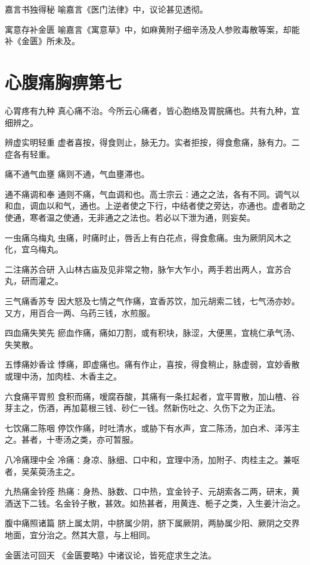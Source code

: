 \documentclass[a4paper,12pt,UTF8,twoside]{ctexbook}
\begin{document}
  嘉言书独得秘
  喻嘉言《医门法律》中，议论甚见透彻。
    
  寓意存补金匮
  喻嘉言《寓意草》中，如麻黄附子细辛汤及人参败毒散等案，却能补《金匮》所未及。
    
  \chapter{心腹痛胸痹第七}
  心胃疼有九种
  真心痛不治。今所云心痛者，皆心胞络及胃脘痛也。共有九种，宜细辨之。
    
  辨虚实明轻重
  虚者喜按，得食则止，脉无力。实者拒按，得食愈痛，脉有力。二症各有轻重。
    
  痛不通气血壅
  痛则不通，气血壅滞也。
    
  通不痛调和奉
  通则不痛，气血调和也。高士宗云∶通之之法，各有不同。调气以和血，调血以和气，通也。上逆者使之下行，中结者使之旁达，亦通也。虚者助之使通，寒者温之使通，无非通之之法也。若必以下泄为通，则妄矣。
    
  一虫痛乌梅丸
  虫痛，时痛时止，唇舌上有白花点，得食愈痛。虫为厥阴风木之化，宜乌梅丸。
    
  二注痛苏合研
  入山林古庙及见非常之物，脉乍大乍小，两手若出两人，宜苏合丸，研而灌之。
    
  三气痛香苏专
  因大怒及七情之气作痛，宜香苏饮，加元胡索二钱，七气汤亦妙。又方，用百合一两、乌药三钱，水煎服。
    
  四血痛失笑先
  瘀血作痛，痛如刀割，或有积块，脉涩，大便黑，宜桃仁承气汤、失笑散。
    
  五悸痛妙香诠
  悸痛，即虚痛也。痛有作止，喜按，得食稍止，脉虚弱，宜妙香散或理中汤，加肉桂、木香主之。
    
  六食痛平胃煎
  食积而痛，嗳腐吞酸，其痛有一条扛起者，宜平胃散，加山楂、谷芽主之，伤酒，再加葛根三钱、砂仁一钱。然新伤吐之、久伤下之为正法。
    
  七饮痛二陈咽
  停饮作痛，时吐清水，或胁下有水声，宜二陈汤，加白术、泽泻主之。甚者，十枣汤之类，亦可暂服。
    
  八冷痛理中全
  冷痛∶身凉、脉细、口中和，宜理中汤，加附子、肉桂主之。兼呕者，吴茱萸汤主之。
    
  九热痛金铃痊
  热痛∶身热、脉数、口中热，宜金铃子、元胡索各二两，研末，黄酒送下二钱。名金铃子散，甚效。如热甚者，用黄连、栀子之类，入生姜汁治之。
    
  腹中痛照诸篇
  脐上属太阴，中脐属少阴，脐下属厥阴，两胁属少阳、厥阴之交界地面，宜分治之。然其大意，与上相同。
    
  金匮法可回天
  《金匮要略》中诸议论，皆死症求生之法。
    
\end{document}
